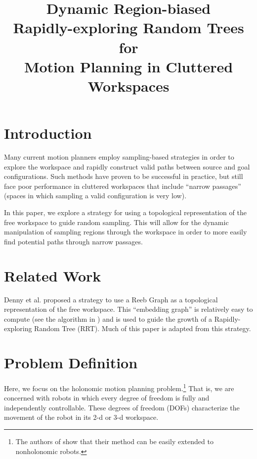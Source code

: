 \documentclass[conference]{IEEEtran}
\begin{document}
	
\title{Dynamic Region-biased \\ Rapidly-exploring Random Trees for \\ Motion Planning in Cluttered Workspaces}

\author{
}

\maketitle
\IEEEpeerreviewmaketitle

\section{Introduction}

Many current motion planners employ sampling-based strategies in order to explore the workspace and rapidly construct valid paths between source and goal configurations. Such methods have proven to be successful in practice, but still face poor performance in cluttered workspaces that include ``narrow passages'' (spaces in which sampling a valid configuration is very low).

In this paper, we explore a strategy for using a topological representation of the free workspace to guide random sampling. This will allow for the dynamic manipulation of sampling regions through the workspace in order to more easily find potential paths through narrow passages.

\section{Related Work}

Denny et al. \cite{DRRRT} proposed a strategy to use a Reeb Graph as a topological representation of the free workspace. This ``embedding graph'' is relatively easy to compute (see the algorithm in \cite{ReebGraphs}) and is used to guide the growth of a Rapidly-exploring Random Tree (RRT). Much of this paper is adapted from this strategy.

\section{Problem Definition}

Here, we focus on the holonomic motion planning problem.\footnote{The authors of \cite{DRRRT} show that their method can be easily extended to nonholonomic robots.} That is, we are concerned with robots in which every degree of freedom is fully and independently controllable. These degrees of freedom (DOFs) characterize the movement of the robot in its 2-d or 3-d workspace.
\end{document}
